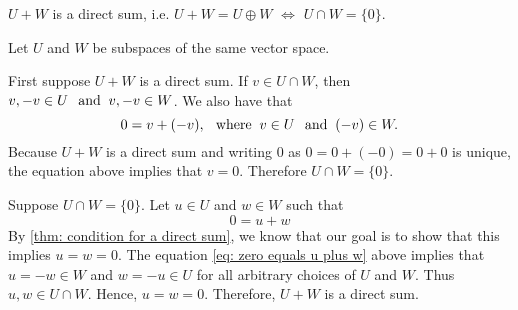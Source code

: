 \setcounter{thm}{45}
\begin{thm} 
  \label{thm: sum and intersection of two subspaces}
  $U+W$ is a direct sum, i.e. $U+W = U \oplus W$ $\iff$ $U \cap W = \{0\}$.
\end{thm}
\begin{prf} Let $U$ and $W$ be subspaces of the same vector space.
  \begin{description}
    \item{\Rightarrowdirection} First suppose $U+W$ is a direct sum. If $v \in U \cap W$, then $v, -v \in U \;\;\, \text{and}\;\; v, -v \in W$. We also have that
    \begin{equation}
      0 = v + (-v), \;\;\, \text{where}\;\; v\in U \;\;\, \text{and}\;\; (-v) \in W.
    \end{equation}
    Because $U+W$  is a direct sum and writing $0$ as $0 = 0+(-0)=0+0$ is unique, the equation above implies that $v=0$. Therefore $U \cap W = \{0\}$.

    \item{\Leftarrowdirection} Suppose $U\cap W = \{0\}$. Let  $u\in U$ and $w \in W$ such that
    \begin{equation}
      \label{eq: zero equals u plus w}
      0 = u+w
    \end{equation}
    By \ref{thm: condition for a direct sum}, we know that our goal is to show that this implies $u=w=0$. The equation \eqref{eq: zero equals u plus w} above implies that $u=-w\in W$  and $w=-u \in U$ for all arbitrary choices of $U$ and $W$. Thus $u,w \in U\cap W$. Hence, $u=w=0$. Therefore, $U+W$ is a direct sum.
  \end{description}
  \vspace{-\baselineskip}
\end{prf}
